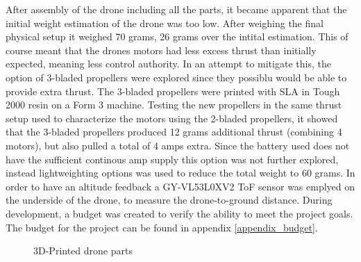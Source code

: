 After assembly of the drone including all the parts, it became apparent that the initial weight estimation of the drone was too low. After weighing the final physical setup it weighed 70 grams, 26 grams over the intital estimation. This of course meant that the drones motors had less excess thrust than initially expected, meaning less control authority. In an attempt to mitigate this, the option of 3-bladed propellers were explored since they possiblu would be able to provide extra thrust. The 3-bladed propellers were printed with SLA in Tough 2000 resin on a Form 3 machine. Testing the new propellers in the same thrust setup used to characterize the motors using the 2-bladed propellers, it showed that the 3-bladed propellers produced 12 grams additional thrust (combining 4 motors), but also pulled a total of 4 amps extra. Since the battery used does not have the sufficient continous amp supply this option was not further explored, instead lightweighting options was used to reduce the total weight to 60 grams. In order to have an altitude feedback a GY-VL53L0XV2 ToF sensor was emplyed on the underside of the drone, to measure the drone-to-ground distance. During development, a budget was created to verify the ability to meet the project goals. The budget for the project can be found in appendix \ref{appendix_budget}.


\begin{figure}[H]%
    \centering
    \qquad
    \qquad
    \caption{3D-Printed drone parts}%
    \label{fig:example}%
\end{figure}